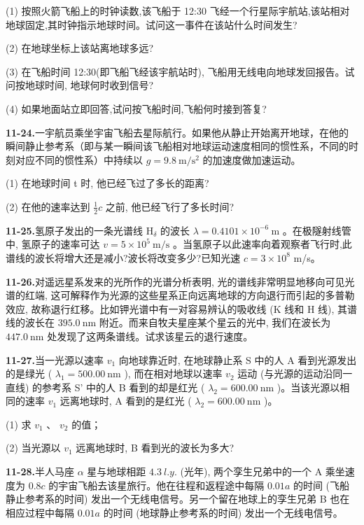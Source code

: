 (1) 按照火箭飞船上的时钟读数,该飞船于 12:30 飞经一个行星际宇航站,该站相对地球固定,其时钟指示地球时间。试问这一事件在该站什么时间发生?

(2) 在地球坐标上该站离地球多远?

(3) 在飞船时间 12:30(即飞船飞经该宇航站时), 飞船用无线电向地球发回报告。试问按地球时间, 地球何时收到信号?

(4) 如果地面站立即回答,试问按飞船时间,飞船何时接到答复?

\vfill\newpage

\textbf{11-24.}一宇航员乘坐宇宙飞船去星际航行。如果他从静止开始离开地球，在他的瞬间静止参考系（即与某一瞬间该飞船相对地球运动速度相同的惯性系，不同的时刻对应不同的惯性系）中持续以 $g = 9.8 \mathrm{~m} / \mathrm{s}^{2}$ 的加速度做加速运动。

(1) 在地球时间 t 时, 他已经飞过了多长的距离?

(2) 在他的速率达到 $\frac{1}{2} c$ 之前, 他已经飞行了多长时间?

\vfill


\textbf{11-25.}氢原子发出的一条光谱线 $\mathrm{H}_{\delta}$ 的波长 $\lambda = 0.4101 \times 10^{-6} \mathrm{~m}$ 。在极隧射线管中, 氢原子的速率可达 $v = 5 \times 10^{5} \mathrm{~m} / \mathrm{s}$ 。当氢原子以此速率向着观察者飞行时,此谱线的波长将增大还是减小?波长将改变多少?已知光速 $c=3\times10^{8}$ m/s。

\vfill\newpage

\textbf{11-26.}对遥远星系发来的光所作的光谱分析表明, 光的谱线非常明显地移向可见光谱的红端, 这可解释作为光源的这些星系正向远离地球的方向退行而引起的多普勒效应, 故称退行红移。比如钾光谱中有一对容易辨认的吸收线 (K 线和 H 线), 其谱线的波长在 $395.0 \mathrm{~nm}$ 附近。而来自牧夫星座某个星云的光中, 我们在波长为 $447.0 \mathrm{~nm}$ 处发现了这两条谱线。试求该星云的退行速度。

\vfill


\textbf{11-27.}当一光源以速率 $v_{1}$ 向地球靠近时, 在地球静止系 S 中的人 A 看到光源发出的是绿光 ( $\lambda_{1} = 500.00 \mathrm{~nm}$ ), 而在相对地球以速率 $v_{2}$ 运动 (与光源的运动沿同一直线) 的参考系 S' 中的人 B 看到的却是红光 ( $\lambda_{2} = 600.00 \mathrm{~nm}$ )。当该光源以相同的速率 $v_{1}$ 远离地球时, A 看到的是红光 ( $\lambda_{2} = 600.00 \mathrm{~nm}$ )。

(1) 求 $v_{1}$ 、 $v_{2}$ 的值；

(2) 当光源以 $v_{1}$ 远离地球时, B 看到光的波长为多大?

\vfill\newpage

\textbf{11-28.}半人马座 $\alpha$ 星与地球相距 $4.3\ l.y.$ (光年), 两个孪生兄弟中的一个 A 乘坐速度为 $0.8 c$ 的宇宙飞船去该星旅行。他在往程和返程途中每隔 $0.01 a$ 的时间 (飞船静止参考系的时间) 发出一个无线电信号。另一个留在地球上的孪生兄弟 B 也在相应过程中每隔 $0.01 a$ 的时间 (地球静止参考系的时间) 发出一个无线电信号。

